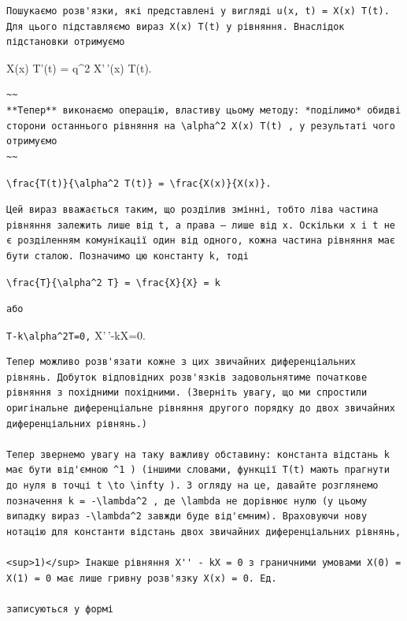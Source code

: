 \documentclass[
  ukrainian,
]{article}
\begin{document}
\begin{verbatim}
Пошукаємо розв'язки, які представлені у вигляді u(x, t) = X(x) T(t). Для цього підставляємо вираз X(x) T(t) у рівняння. Внаслідок підстановки отримуємо
\end{verbatim}

X(x) T'(t) = q\^{}2 X'\,'(x) T(t).

\begin{verbatim}
~~
**Тепер** виконаємо операцію, властиву цьому методу: *поділимо* обидві сторони останнього рівняння на \alpha^2 X(x) T(t) , у результаті чого отримуємо
~~
\end{verbatim}

\texttt{\textbackslash{}frac\{T\textquotesingle{}(t)\}\{\textbackslash{}alpha\^{}2\ T(t)\}\ =\ \textbackslash{}frac\{X\textquotesingle{}\textquotesingle{}(x)\}\{X(x)\}.}

\begin{verbatim}
Цей вираз вважається таким, що розділив змінні, тобто ліва частина рівняння залежить лише від t, а права — лише від x. Оскільки x і t не є розділенням комунікації один від одного, кожна частина рівняння має бути сталою. Позначимо цю константу k, тоді
\end{verbatim}

\texttt{\textbackslash{}frac\{T\textquotesingle{}\}\{\textbackslash{}alpha\^{}2\ T\}\ =\ \textbackslash{}frac\{X\textquotesingle{}\textquotesingle{}\}\{X\}\ =\ k}

\begin{verbatim}
або
\end{verbatim}

\texttt{T\textquotesingle{}-k\textbackslash{}alpha\^{}2T=0,} X'\,'-kX=0.

\begin{verbatim}
Тепер можливо розв'язати кожне з цих звичайних диференціальних рівнянь. Добуток відповідних розв'язків задовольнятиме початкове рівняння з похідними похідними. (Зверніть увагу, що ми спростили оригінальне диференціальне рівняння другого порядку до двох звичайних диференціальних рівнянь.)

Тепер звернемо увагу на таку важливу обставину: константа відстань k має бути від'ємною ^1 ) (іншими словами, функції T(t) мають прагнути до нуля в точці t \to \infty ). З огляду на це, давайте розглянемо позначення k = -\lambda^2 , де \lambda не дорівнює нулю (у цьому випадку вираз -\lambda^2 завжди буде від'ємним). Враховуючи нову нотацію для константи відстань двох звичайних диференціальних рівнянь,

<sup>1)</sup> Інакше рівняння X'' - kX = 0 з граничними умовами X(0) = X(1) = 0 має лише гривну розв'язку X(x) = 0. Ед.

записуються у формі
\end{verbatim}
\end{document}
